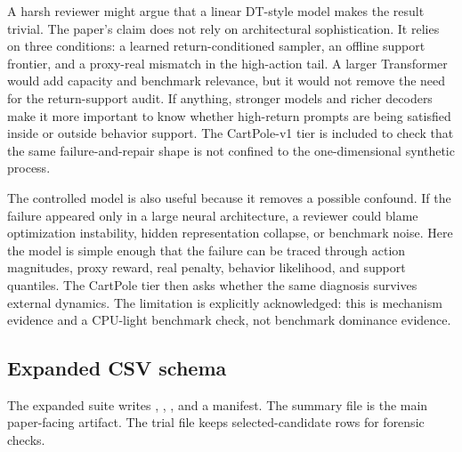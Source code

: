 A harsh reviewer might argue that a linear DT-style model makes the result trivial. The paper's claim does not rely on architectural sophistication. It relies on three conditions: a learned return-conditioned sampler, an offline support frontier, and a proxy-real mismatch in the high-action tail. A larger Transformer would add capacity and benchmark relevance, but it would not remove the need for the return-support audit. If anything, stronger models and richer decoders make it more important to know whether high-return prompts are being satisfied inside or outside behavior support. The CartPole-v1 tier is included to check that the same failure-and-repair shape is not confined to the one-dimensional synthetic process.

The controlled model is also useful because it removes a possible confound. If the failure appeared only in a large neural architecture, a reviewer could blame optimization instability, hidden representation collapse, or benchmark noise. Here the model is simple enough that the failure can be traced through action magnitudes, proxy reward, real penalty, behavior likelihood, and support quantiles. The CartPole tier then asks whether the same diagnosis survives external dynamics. The limitation is explicitly acknowledged: this is mechanism evidence and a CPU-light benchmark check, not benchmark dominance evidence.

\subsection{Expanded CSV schema}

The expanded suite writes , , , and a manifest. The summary file is the main paper-facing artifact. The trial file keeps selected-candidate rows for forensic checks.

